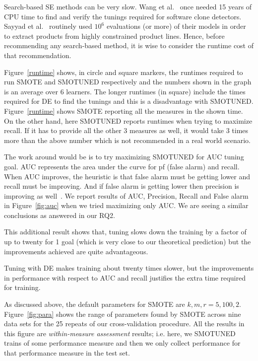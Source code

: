 \documentclass[10pt,conference]{IEEEtran}
\theoremstyle{break}
\theoremstyle{break}
\begin{document}
Search-based SE methods can be very slow. Wang et al.~\cite{wang2013searching} once needed 15
years of CPU time to find and verify the tunings required for software
clone detectors. Sayyad et al.~\cite{sayyad2013scalable} routinely used
$10^6$ evaluations (or more) of their models in order to extract
products from highly constrained product
lines. Hence, before recommending any
search-based method, it is wise to consider the runtime cost of that
recommendation.


 Figure~\ref{runtime} shows,  in circle and square markers, the
  runtimes required to run SMOTE and SMOTUNED respectively and the numbers shown in the graph is an average over 6 learners.  The
  longer runtimes (in square) include the times required for DE to find
  the tunings and this is a disadvantage with SMOTUNED. Figure~\ref{runtime} shows SMOTE reporting all the measures in the shown time. On the other hand, here SMOTUNED reports runtimes when trying to maximize recall. If it has to provide all the other 3 measures as well, it would take 3 times more than the above number which is not recommended in a real world scenario. 
  
  The work around would be is to try maximizing SMOTUNED for AUC tuning goal. AUC represents the area under the curve for pf (false alarm) and recall. When AUC improves, the heuristic is that false alarm must be getting lower and recall must be improving. And if false alarm is getting lower then precision is improving as well~\cite{menzies2007data}. We report results of AUC, Precision, Recall and False alarm in Figure~\ref{fig:auc} when we tried maximizing only AUC. We are seeing a similar conclusions as answered in our RQ2. 
  
  This additional result shows that, tuning slows down the training by a factor of up to
  twenty for 1 goal (which is very close to our theoretical prediction) but the improvements achieved are quite advantageous.

\begin{lesson1}
    Tuning with DE makes training about twenty times slower, but the improvements in performance with respect to AUC and recall justifies the extra time required for training.
\end{lesson1}

 
 As discussed above, the default parameters for
 SMOTE are $k,m,r = 5,100,2$.
  Figure~\ref{fig:para} shows the range of parameters
 found by SMOTE across  nine data sets for the 25 repeats of our cross-validation procedure.
 All the results in this figure are {\em within-measure assessment} results; i.e.
 here, we SMOTUNED trains of some performance measure and then we only collect performance for that performance measure in the test set.
 
\end{document}
